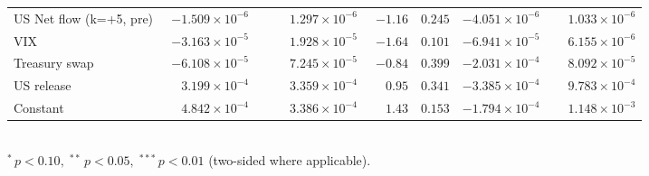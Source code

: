 \documentclass[10pt]{article}
\begin{document}
\begin{tabular}{@{}l|r@{}l rrr rr@{}}
US Net flow (k=+5, pre) & $-1.509\!\times\!10^{-6}$ & \textsuperscript{} & $\phantom{-}1.297\!\times\!10^{-6}$ & $-1.16$ & $0.245$ & $-4.051\!\times\!10^{-6}$ & $\phantom{-}1.033\!\times\!10^{-6}$ \\
\addlinespace[0.3em]
VIX & $-3.163\!\times\!10^{-5}$ & \textsuperscript{} & $\phantom{-}1.928\!\times\!10^{-5}$ & $-1.64$ & $0.101$ & $-6.941\!\times\!10^{-5}$ & $\phantom{-}6.155\!\times\!10^{-6}$ \\
Treasury swap & $-6.108\!\times\!10^{-5}$ & \textsuperscript{} & $\phantom{-}7.245\!\times\!10^{-5}$ & $-0.84$ & $0.399$ & $-2.031\!\times\!10^{-4}$ & $\phantom{-}8.092\!\times\!10^{-5}$ \\
US release & $\phantom{-}3.199\!\times\!10^{-4}$ & \textsuperscript{} & $\phantom{-}3.359\!\times\!10^{-4}$ & $\phantom{-}0.95$ & $0.341$ & $-3.385\!\times\!10^{-4}$ & $\phantom{-}9.783\!\times\!10^{-4}$ \\
\addlinespace[0.3em]
Constant & $\phantom{-}4.842\!\times\!10^{-4}$ & \textsuperscript{} & $\phantom{-}3.386\!\times\!10^{-4}$ & $\phantom{-}1.43$ & $0.153$ & $-1.794\!\times\!10^{-4}$ & $\phantom{-}1.148\!\times\!10^{-3}$ \\
\hline
\end{tabular}
\\[0.2em]
{\footnotesize $^{*}\,p<0.10,\;^{**}\,p<0.05,\;^{***}\,p<0.01$ (two-sided where applicable).}
\vspace{0.9em}
\end{document}
